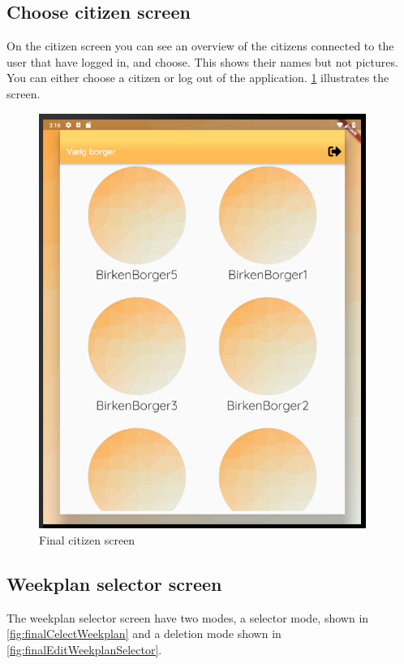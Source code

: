 \subsection{Choose citizen screen}
On the citizen screen you can see an overview of the citizens connected to the user that have logged in, and choose. This shows their names but not pictures. You can either choose a citizen or log out of the application. \ref{fig:finalCitizenScreen} illustrates the screen.
\begin{figure}[H]
    \begin{center}
        \includegraphics[width=0.95\textwidth]{figures/FinalScreen/chooseCitizenScreen.png}
    \end{center}
    \caption{Final citizen screen}
    \label{fig:finalCitizenScreen}
\end{figure}

\subsection{Weekplan selector screen}
The weekplan selector screen have two modes, a selector mode, shown in \ref{fig:finalCelectWeekplan} and a deletion mode shown in \ref{fig:finalEditWeekplanSelector}.

